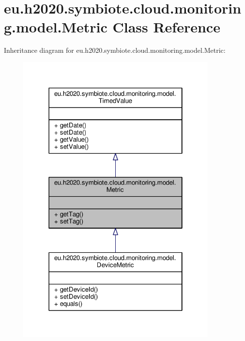 \hypertarget{classeu_1_1h2020_1_1symbiote_1_1cloud_1_1monitoring_1_1model_1_1Metric}{}\section{eu.\+h2020.\+symbiote.\+cloud.\+monitoring.\+model.\+Metric Class Reference}
\label{classeu_1_1h2020_1_1symbiote_1_1cloud_1_1monitoring_1_1model_1_1Metric}


Inheritance diagram for eu.\+h2020.\+symbiote.\+cloud.\+monitoring.\+model.\+Metric\+:\nopagebreak
\begin{figure}[H]
\begin{center}
\leavevmode
\includegraphics[width=286pt]{classeu_1_1h2020_1_1symbiote_1_1cloud_1_1monitoring_1_1model_1_1Metric__inherit__graph}
\end{center}
\end{figure}



